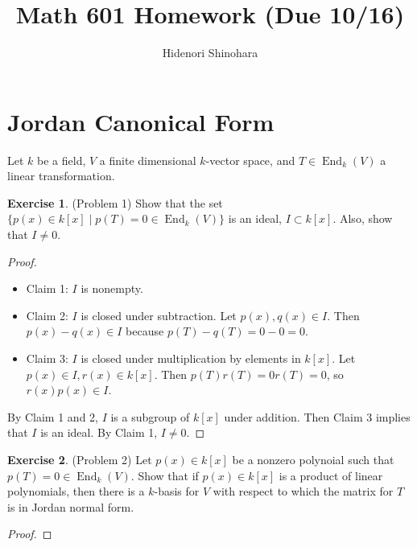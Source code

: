 \documentclass[12pt, psamsfonts]{amsart}
\theoremstyle{definition}
\newtheorem*{exer}{Exercise}
\theoremstyle{remark}
\DeclareMathOperator{\End}{End}
\numberwithin{equation}{section}
\begin{document}
\title{Math 601 Homework (Due 10/16)}
\author{Hidenori Shinohara}
\maketitle

\tableofcontents

\section{Jordan Canonical Form}

Let $k$ be a field, $V$ a finite dimensional $k$-vector space, and $T \in \End_k(V)$ a linear transformation.

\begin{exer}{(Problem 1)}
  Show that the set $\{ p(x) \in k[x] \mid p(T) = 0 \in \End_k(V) \}$ is an ideal, $I \subset k[x]$.
  Also, show that $I \ne 0$.
\end{exer}

\begin{proof}
$ $
 \begin{itemize}
   \item
    Claim 1: $I$ is nonempty.
   \item
    Claim 2: $I$ is closed under subtraction.
    Let $p(x), q(x) \in I$.
    Then $p(x) - q(x) \in I$ because $p(T) - q(T) = 0 - 0 = 0$.
   \item
    Claim 3: $I$ is closed under multiplication by elements in $k[x]$.
    Let $p(x) \in I, r(x) \in k[x]$.
    Then $p(T)r(T) = 0r(T) = 0$, so $r(x)p(x) \in I$.
 \end{itemize}
 By Claim 1 and 2, $I$ is a subgroup of $k[x]$ under addition.
 Then Claim 3 implies that $I$ is an ideal.
 By Claim 1, $I \ne 0$.
\end{proof}

\begin{exer}{(Problem 2)}
  Let $p(x) \in k[x]$ be a nonzero polynoial such that $p(T) = 0 \in \End_k(V)$.
  Show that if $p(x) \in k[x]$ is a product of linear polynomials, then there is a $k$-basis for $V$ with respect to which the matrix for $T$ is in Jordan normal form.
\end{exer}

\begin{proof}
\end{proof}
\end{document}
